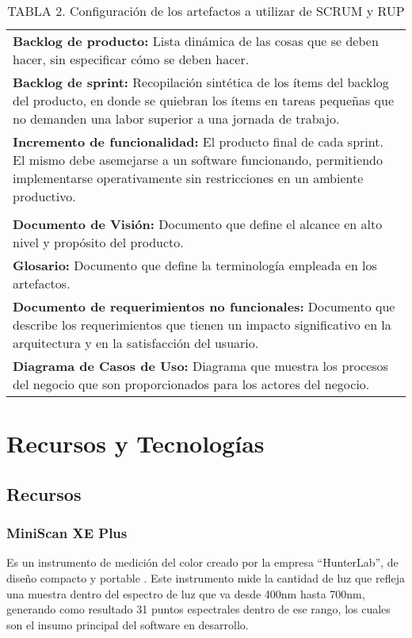 \documentclass[conference]{IEEEtran}
\begin{document}
		\FloatBarrier %
		\begin{table}[htb]
			\caption{TABLA 2. Configuraci\'{o}n de los artefactos a utilizar de SCRUM y RUP}
			\label{tabla_2}
			\centering
			\setlength{\extrarowheight}{2.5pt}
			\begin{tabulary}{8.8cm}{|J|}
				\hline
				\\ \hline
				\textbf{Backlog de producto: }Lista din\'{a}mica de las cosas que se deben hacer, sin especificar c\'{o}mo se deben hacer.\\ \hline
				\textbf{Backlog de sprint: }Recopilaci\'{o}n sint\'{e}tica de los \'{i}tems del backlog del producto, en donde se quiebran los \'{i}tems en tareas peque\~{n}as que no demanden una labor superior a una jornada de trabajo.\\ \hline
				\textbf{Incremento de funcionalidad: }El producto final de cada sprint. El mismo debe asemejarse a un software funcionando, permitiendo implementarse operativamente sin restricciones en un ambiente productivo.\\ \hline
				\\ \hline
				\textbf{Documento de Visi\'{o}n: }Documento que define el alcance en alto nivel y prop\'{o}sito del producto.\\
\hline
				\textbf{Glosario: }Documento que define la terminolog\'{i}a empleada en los artefactos.\\ \hline
				\textbf{Documento de requerimientos no funcionales: }Documento que describe los requerimientos que tienen un impacto significativo en la arquitectura y en la satisfacci\'{o}n del usuario.\\ \hline
		\textbf{Diagrama de Casos de Uso: }Diagrama que muestra los procesos del negocio que son proporcionados para los actores del negocio.\\ \hline
			\end{tabulary}
		\end{table}
		\FloatBarrier %

\section{Recursos y Tecnolog\'{i}as}	
	
	\subsection{Recursos}
		\subsubsection{MiniScan XE Plus}
		Es un instrumento de medici\'{o}n del color creado por la empresa ``HunterLab'', de dise\~{n}o compacto y portable \cite{MiniScanXEPlus-manual}. Este instrumento mide la cantidad de luz que refleja una muestra dentro del espectro de luz que va desde 400nm hasta 700nm, generando como resultado 31 puntos espectrales dentro de ese rango, los cuales son el insumo principal del software en desarrollo.
\end{document}

